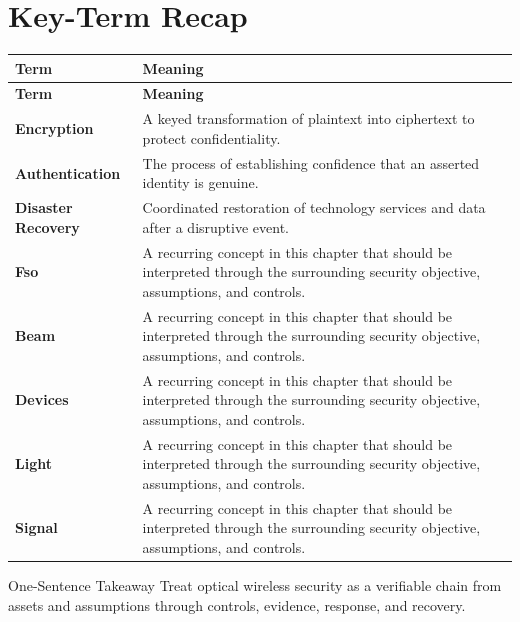 \documentclass[11pt,letterpaper]{article}
\begin{document}
\section*{Key-Term Recap}
\begin{longtable}{>{\raggedright\arraybackslash}p{}>{\raggedright\arraybackslash}p{}}
\toprule\rowcolor{Navy}\color{white}\textbf{Term} & \color{white}\textbf{Meaning}\\\midrule
\endfirsthead
\toprule\rowcolor{Navy}\color{white}\textbf{Term} & \color{white}\textbf{Meaning}\\\midrule
\endhead
\textbf{Encryption} & A keyed transformation of plaintext into ciphertext to protect confidentiality. \\\midrule
\textbf{Authentication} & The process of establishing confidence that an asserted identity is genuine. \\\midrule
\textbf{Disaster Recovery} & Coordinated restoration of technology services and data after a disruptive event. \\\midrule
\textbf{Fso} & A recurring concept in this chapter that should be interpreted through the surrounding security objective, assumptions, and controls. \\\midrule
\textbf{Beam} & A recurring concept in this chapter that should be interpreted through the surrounding security objective, assumptions, and controls. \\\midrule
\textbf{Devices} & A recurring concept in this chapter that should be interpreted through the surrounding security objective, assumptions, and controls. \\\midrule
\textbf{Light} & A recurring concept in this chapter that should be interpreted through the surrounding security objective, assumptions, and controls. \\\midrule
\textbf{Signal} & A recurring concept in this chapter that should be interpreted through the surrounding security objective, assumptions, and controls. \\\midrule
\bottomrule
\end{longtable}
\begin{CornellExamBox}{One-Sentence Takeaway}
Treat optical wireless security as a verifiable chain from assets and assumptions through controls, evidence, response, and recovery.
\end{CornellExamBox}
\end{document}
